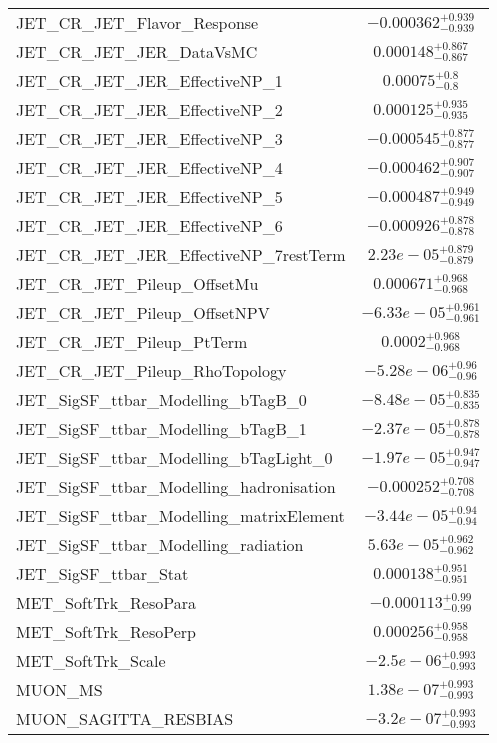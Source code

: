 \begin{tabular}{|l|c|}
JET\_CR\_JET\_Flavor\_Response & $-0.000362^{+0.939}_{-0.939}$ \\
JET\_CR\_JET\_JER\_DataVsMC & $0.000148^{+0.867}_{-0.867}$ \\
JET\_CR\_JET\_JER\_EffectiveNP\_1 & $0.00075^{+0.8}_{-0.8}$ \\
JET\_CR\_JET\_JER\_EffectiveNP\_2 & $0.000125^{+0.935}_{-0.935}$ \\
JET\_CR\_JET\_JER\_EffectiveNP\_3 & $-0.000545^{+0.877}_{-0.877}$ \\
JET\_CR\_JET\_JER\_EffectiveNP\_4 & $-0.000462^{+0.907}_{-0.907}$ \\
JET\_CR\_JET\_JER\_EffectiveNP\_5 & $-0.000487^{+0.949}_{-0.949}$ \\
JET\_CR\_JET\_JER\_EffectiveNP\_6 & $-0.000926^{+0.878}_{-0.878}$ \\
JET\_CR\_JET\_JER\_EffectiveNP\_7restTerm & $2.23e-05^{+0.879}_{-0.879}$ \\
JET\_CR\_JET\_Pileup\_OffsetMu & $0.000671^{+0.968}_{-0.968}$ \\
JET\_CR\_JET\_Pileup\_OffsetNPV & $-6.33e-05^{+0.961}_{-0.961}$ \\
JET\_CR\_JET\_Pileup\_PtTerm & $0.0002^{+0.968}_{-0.968}$ \\
JET\_CR\_JET\_Pileup\_RhoTopology & $-5.28e-06^{+0.96}_{-0.96}$ \\
JET\_SigSF\_ttbar\_Modelling\_bTagB\_0 & $-8.48e-05^{+0.835}_{-0.835}$ \\
JET\_SigSF\_ttbar\_Modelling\_bTagB\_1 & $-2.37e-05^{+0.878}_{-0.878}$ \\
JET\_SigSF\_ttbar\_Modelling\_bTagLight\_0 & $-1.97e-05^{+0.947}_{-0.947}$ \\
JET\_SigSF\_ttbar\_Modelling\_hadronisation & $-0.000252^{+0.708}_{-0.708}$ \\
JET\_SigSF\_ttbar\_Modelling\_matrixElement & $-3.44e-05^{+0.94}_{-0.94}$ \\
JET\_SigSF\_ttbar\_Modelling\_radiation & $5.63e-05^{+0.962}_{-0.962}$ \\
JET\_SigSF\_ttbar\_Stat & $0.000138^{+0.951}_{-0.951}$ \\
MET\_SoftTrk\_ResoPara & $-0.000113^{+0.99}_{-0.99}$ \\
MET\_SoftTrk\_ResoPerp & $0.000256^{+0.958}_{-0.958}$ \\
MET\_SoftTrk\_Scale & $-2.5e-06^{+0.993}_{-0.993}$ \\
MUON\_MS & $1.38e-07^{+0.993}_{-0.993}$ \\
MUON\_SAGITTA\_RESBIAS & $-3.2e-07^{+0.993}_{-0.993}$ \\

\end{tabular}
